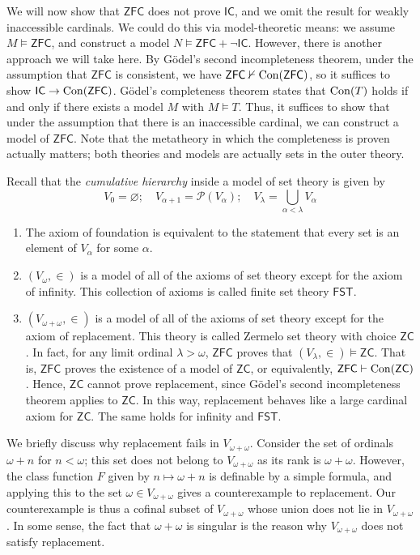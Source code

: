 We will now show that \( \mathsf{ZFC} \) does not prove \( \mathsf{IC} \), and we omit the result for weakly inaccessible cardinals.
We could do this via model-theoretic means: we assume \( M \vDash \mathsf{ZFC} \), and construct a model \( N \vDash \mathsf{ZFC} + \neg \mathsf{IC} \).
However, there is another approach we will take here.
By G\"odel's second incompleteness theorem, under the assumption that \( \mathsf{ZFC} \) is consistent, we have \( \mathsf{ZFC} \nvdash \operatorname{Con}(\mathsf{ZFC}) \), so it suffices to show \( \mathsf{IC} \to \operatorname{Con}(\mathsf{ZFC}) \).
G\"odel's completeness theorem states that \( \operatorname{Con}(T) \) holds if and only if there exists a model \( M \) with \( M \vDash T \).
Thus, it suffices to show that under the assumption that there is an inaccessible cardinal, we can construct a model of \( \mathsf{ZFC} \).
Note that the metatheory in which the completeness is proven actually matters; both theories and models are actually sets in the outer theory.

Recall that the \emph{cumulative hierarchy} inside a model of set theory is given by
\[ V_0 = \varnothing;\quad V_{\alpha + 1} = \mathcal P(V_\alpha);\quad V_\lambda = \bigcup_{\alpha < \lambda} V_\alpha \]
\begin{enumerate}
    \item The axiom of foundation is equivalent to the statement that every set is an element of \( V_\alpha \) for some \( \alpha \).
    \item \( (V_\omega, \in) \) is a model of all of the axioms of set theory except for the axiom of infinity.
    This collection of axioms is called finite set theory \( \mathsf{FST} \).
    \item \( (V_{\omega + \omega}, \in) \) is a model of all of the axioms of set theory except for the axiom of replacement.
    This theory is called Zermelo set theory with choice \( \mathsf{ZC} \).
    In fact, for any limit ordinal \( \lambda > \omega \), \( \mathsf{ZFC} \) proves that \( (V_\lambda, \in) \vDash \mathsf{ZC} \).
    That is, \( \mathsf{ZFC} \) proves the existence of a model of \( \mathsf{ZC} \), or equivalently, \( \mathsf{ZFC} \vdash \operatorname{Con}(\mathsf{ZC}) \).
    Hence, \( \mathsf{ZC} \) cannot prove replacement, since G\"odel's second incompleteness theorem applies to \( \mathsf{ZC} \).
    In this way, replacement behaves like a large cardinal axiom for \( \mathsf{ZC} \).
    The same holds for infinity and \( \mathsf{FST} \).
\end{enumerate}
We briefly discuss why replacement fails in \( V_{\omega + \omega} \).
Consider the set of ordinals \( \omega + n \) for \( n < \omega \); this set does not belong to \( V_{\omega + \omega} \) as its rank is \( \omega + \omega \).
However, the class function \( F \) given by \( n \mapsto \omega + n \) is definable by a simple formula, and applying this to the set \( \omega \in V_{\omega + \omega} \) gives a counterexample to replacement.
Our counterexample is thus a cofinal subset of \( V_{\omega + \omega} \) whose union does not lie in \( V_{\omega + \omega} \).
In some sense, the fact that \( \omega + \omega \) is singular is the reason why \( V_{\omega + \omega} \) does not satisfy replacement.

